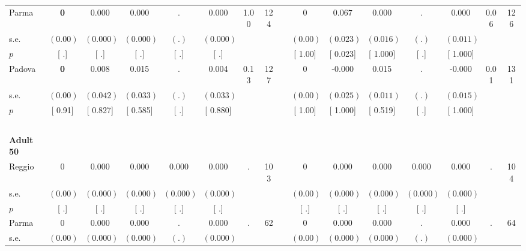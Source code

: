 \begin{longtable}{L{8em} c c c c c c c p{1em} c c c c c c c}
\quad \quad \quad Parma& \textbf{0} &     0.000 &     0.000 &         . &     0.000 &      1.00 &       124 & & 0 & $ \mathbf{    0.067}$ &     0.000 &         . &     0.000 &      0.06 &       126  \\*
\quad \quad \quad \quad s.e.& $ (     0.00)$ & $ (    0.000)$ & $ (    0.000)$ & $ (        .)$ & $ (    0.000)$ & & & & $ (     0.00)$ & $ (    0.023)$ & $ (    0.016)$ & $ (        .)$ & $ (    0.011)$ & &  \\*
\quad \quad \quad \quad $ p$ & [        .] & [        .] & [        .] & [        .] & [        .] & & & & [     1.00] & [    0.023] & [    1.000] & [        .] & [    1.000] & &  \\[1em]
\quad \quad \quad Padova& \textbf{0} &     0.008 &     0.015 &         . &     0.004 &      0.13 &       127 & & 0 &    -0.000 &     0.015 &         . &    -0.000 &      0.01 &       131  \\*
\quad \quad \quad \quad s.e.& $ (     0.00)$ & $ (    0.042)$ & $ (    0.033)$ & $ (        .)$ & $ (    0.033)$ & & & & $ (     0.00)$ & $ (    0.025)$ & $ (    0.011)$ & $ (        .)$ & $ (    0.015)$ & &  \\*
\quad \quad \quad \quad $ p$ & [     0.91] & [    0.827] & [    0.585] & [        .] & [    0.880] & & & & [     1.00] & [    1.000] & [    0.519] & [        .] & [    1.000] & &  \\[1em]
~\\[1em]
\quad \quad \textbf{Adult 50} & & & & & & & & & & & & & & & \\* 
\quad \quad \quad Reggio& 0 &     0.000 &     0.000 &     0.000 &     0.000 &         . &       103 & & 0 &     0.000 &     0.000 &     0.000 &     0.000 &         . &       104  \\*
\quad \quad \quad \quad s.e.& $ (     0.00)$ & $ (    0.000)$ & $ (    0.000)$ & $ (    0.000)$ & $ (    0.000)$ & & & & $ (     0.00)$ & $ (    0.000)$ & $ (    0.000)$ & $ (    0.000)$ & $ (    0.000)$ & &  \\*
\quad \quad \quad \quad $ p$ & [        .] & [        .] & [        .] & [        .] & [        .] & & & & [        .] & [        .] & [        .] & [        .] & [        .] & &  \\[1em]
\quad \quad \quad Parma& 0 &     0.000 &     0.000 &         . &     0.000 &         . &        62 & & 0 &     0.000 &     0.000 &         . &     0.000 &         . &        64  \\*
\quad \quad \quad \quad s.e.& $ (     0.00)$ & $ (    0.000)$ & $ (    0.000)$ & $ (        .)$ & $ (    0.000)$ & & & & $ (     0.00)$ & $ (    0.000)$ & $ (    0.000)$ & $ (        .)$ & $ (    0.000)$ & &  \\*

\end{longtable}
